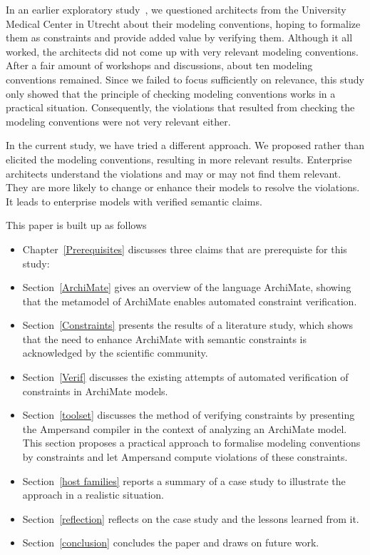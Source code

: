 \documentclass[sn-vancouver]{sn-jnl}%
\theoremstyle{thmstyleone}%
\theoremstyle{thmstyletwo}%
\theoremstyle{thmstylethree}%
\begin{document}
In an earlier exploratory study~\cite{iceis22}, we questioned architects from the University Medical Center in Utrecht about their modeling conventions,
hoping to formalize them as constraints and provide added value by verifying them.
Although it all worked, the architects did not come up with very relevant modeling conventions.
After a fair amount of workshops and discussions, about ten modeling conventions remained.
Since we failed to focus sufficiently on relevance, this study only showed that the principle of checking modeling conventions works in a practical situation.
Consequently, the violations that resulted from checking the modeling conventions were not very relevant either.

In the current study, we have tried a different approach.
We proposed rather than elicited the modeling conventions,
resulting in more relevant results.
Enterprise architects understand the violations and may or may not find them relevant.
They are more likely to change or enhance their models to resolve the violations.
It leads to enterprise models with verified semantic claims.

This paper is built up as follows
\begin{itemize}
\item Chapter~\ref{Prerequisites} discusses three claims that are prerequiste for this study:
\item
Section~\ref{ArchiMate} gives an overview of the language ArchiMate, showing that the metamodel of ArchiMate enables automated constraint verification.
\item
Section~\ref{Constraints} presents the results of a literature study, which shows that the need to enhance ArchiMate with semantic constraints is acknowledged by the scientific community.
\item
Section~\ref{Verif} discusses the existing attempts of automated verification of constraints in ArchiMate models.
\item
Section~\ref{toolset} discusses the method of verifying constraints by presenting the Ampersand compiler in the context of analyzing an ArchiMate model.
This section proposes a practical approach to formalise modeling conventions by constraints and let Ampersand compute violations of these constraints.
\item
Section~\ref{host families} reports a summary of a case study to illustrate the approach in a realistic situation.
\item
Section~\ref{reflection} reflects on the case study and the lessons learned from it.
\item
Section~\ref{conclusion} concludes the paper and draws on future work.
\end{itemize}
\end{document}
